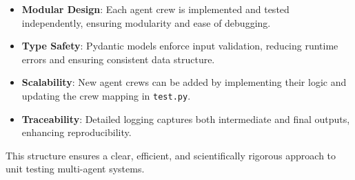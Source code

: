 \begin{itemize}
    \item \textbf{Modular Design}: Each agent crew is implemented and tested independently, ensuring modularity and ease of debugging.
    \item \textbf{Type Safety}: Pydantic models enforce input validation, reducing runtime errors and ensuring consistent data structure.
    \item \textbf{Scalability}: New agent crews can be added by implementing their logic and updating the crew mapping in \texttt{test.py}.
    \item \textbf{Traceability}: Detailed logging captures both intermediate and final outputs, enhancing reproducibility.
\end{itemize}

This structure ensures a clear, efficient, and scientifically rigorous approach to unit testing multi-agent systems.
